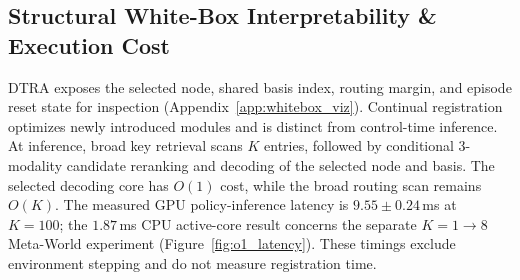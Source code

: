 \documentclass[10pt]{article}
\begin{document}
\subsection{Structural White-Box Interpretability \& Execution Cost}
DTRA exposes the selected node, shared basis index, routing margin, and episode reset state for inspection (Appendix~\ref{app:whitebox_viz}). Continual registration optimizes newly introduced modules and is distinct from control-time inference. At inference, broad key retrieval scans $K$ entries, followed by conditional 3-modality candidate reranking and decoding of the selected node and basis. The selected decoding core has $O(1)$ cost, while the broad routing scan remains $O(K)$. The measured GPU policy-inference latency is $9.55 \pm 0.24$\,ms at $K=100$; the $1.87\,$ms CPU active-core result concerns the separate $K=1 \to 8$ Meta-World experiment (Figure~\ref{fig:o1_latency}). These timings exclude environment stepping and do not measure registration time.
\end{document}
